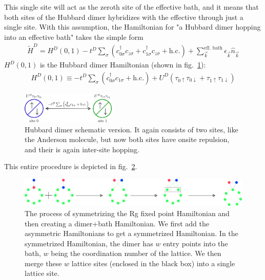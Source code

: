 \documentclass{report}
\numberwithin{equation}{section}
\begin{document}
 This single site will act as the zeroth site of the effective bath, and it means that both sites of the Hubbard dimer hybridizes with the effective through just a single site. With this assumption, the Hamiltonian for "a Hubbard dimer hopping into an effective bath" takes the simple form
 \begin{equation}\begin{aligned}
 	\label{dimer_p_bat}
 	\tilde H^D = H^D(0,1) - t^D \sum_{\sigma}\left(c^\dagger_{0\sigma}c_{z\sigma} + c^\dagger_{1\sigma}c_{z\sigma} + \text{h.c.}\right) + \sum_{\vec k}^\text{eff. bath}\epsilon_{\vec k}\hat n_{\vec k}
 \end{aligned}\end{equation}
 \(H^D(0,1)\) is the Hubbard dimer Hamiltonian (shown in fig.~\ref{hubb-dim}):
 \begin{equation}\begin{aligned}
 	\label{dimer_ham}
 	H^D(0,1) \equiv -t^D\sum_\sigma\left( c^\dagger_{0\sigma}c_{1\sigma} + \text{h.c.} \right) + U^D\left( \tau_{0 \uparrow}\tau_{0 \downarrow} + \tau_{1 \uparrow}\tau_{1 \downarrow}\right)
 \end{aligned}\end{equation}
 \begin{figure}[htpb!]
 	\centering
 	\includegraphics[width=0.4\textwidth]{../figures/hubb_dim.png}
 	\caption{Hubbard dimer schematic version. It again consists of two sites, like the Anderson molecule, but now both sites have onsite repulsion, and their is again inter-site hopping.}
 	\label{hubb-dim}
 \end{figure}
 This entire procedure is depicted in fig.~\ref{dimer-bath}.
 \begin{figure}[htpb]
 	\centering
 	\includegraphics[width=\textwidth]{../figures/dimer_bath.pdf}
 	\caption{The process of symmetrizing the Rg fixed point Hamiltonian and then creating a dimer+bath Hamiltonian. We first add the asymmetric Hamiltonians to get a symmetrized Hamiltonian. In the symmetrized Hamiltonian, the dimer has \(w\) entry points into the bath, \(w\) being the coordination number of the lattice. We then merge these \(w\) lattice sites (enclosed in the black box) into a single lattice site.}
 	\label{dimer-bath} 
 \end{figure}
\end{document}
